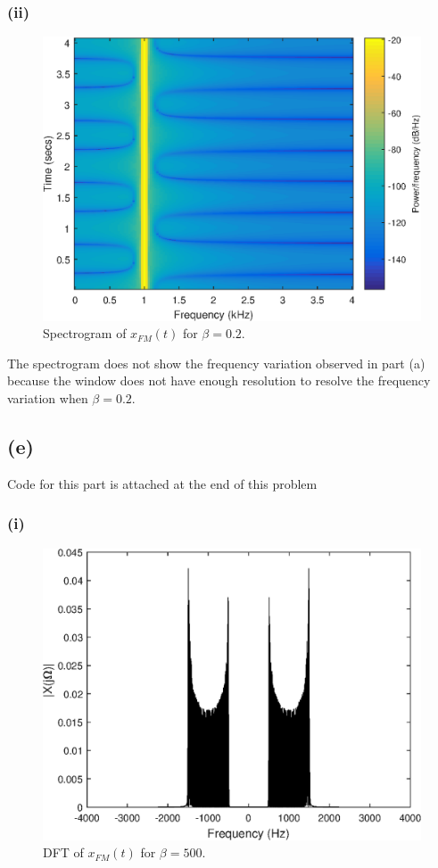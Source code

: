 \documentclass{article}
\begin{document}
\subsubsection{(ii)}
\FloatBarrier
\begin{figure}[h!]
	\centering
	\includegraphics[scale=0.7]{figs/hw6_fm_dii.eps}
	\caption{Spectrogram of $x_{FM}(t)$ for $\beta = 0.2$.}
\end{figure}
\FloatBarrier

The spectrogram does not show the frequency variation observed in part (a) because the window does not have enough resolution to resolve the frequency variation when $\beta = 0.2$.


\subsection{(e)}
Code for this part is attached at the end of this problem

\subsubsection{(i)}
\FloatBarrier
\begin{figure}[h!]
	\centering
	\includegraphics[scale=0.7]{figs/hw6_fm_ei.eps}
	\caption{DFT of $x_{FM}(t)$ for $\beta = 500$.}
\end{figure}
\FloatBarrier
\end{document}
